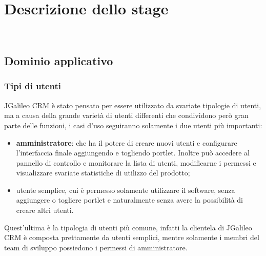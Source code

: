 
\chapter{Descrizione dello stage}
\label{cap:descrizione-stage}

\\


\section{Dominio applicativo}
\subsection{Tipi di utenti}
JGalileo CRM è stato pensato per essere utilizzato da svariate tipologie di utenti, ma a causa della grande varietà di utenti differenti che condividono però gran parte delle funzioni, i casi d'uso seguiranno solamente i due utenti più importanti:
\begin{itemize}
	\item \textbf{amministratore}: che ha il potere di creare nuovi utenti e configurare l'interfaccia finale aggiungendo e togliendo \gls{portlet}. Inoltre può accedere al pannello di controllo e monitorare la lista di utenti, modificarne i permessi e visualizzare svariate statistiche di utilizzo del prodotto;
	\item{utente semplice}, cui è permesso solamente utilizzare il software, senza aggiungere o togliere \gls{portlet} e naturalmente senza avere la possibilità di creare altri utenti.\\
\end{itemize}
	Quest'ultima è la tipologia di utenti più comune, infatti la clientela di JGalileo CRM è composta prettamente da utenti semplici, mentre solamente i membri del team di sviluppo possiedono i permessi di amministratore.
